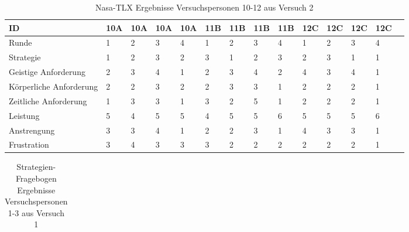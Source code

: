 \documentclass[12pt,a4paper]{scrartcl}
\begin{document}
\begin{appendix}
\begin{table}
\bigskip\bigskip  %
\caption{Nasa-TLX Ergebnisse Versuchspersonen 10-12 aus Versuch 2}

\smallskip
\begin{tabular}{|p{6cm}| p{0.8cm} | p{0.8cm} | p{0.8cm} | p{0.8cm} || p{0.8cm} | p{0.8cm} | p{0.8cm} | p{0.8cm} || p{0.8cm} | p{0.8cm} | p{0.8cm} | p{0.8cm} | p{} | }
\hline
	ID & 10A & 10A & 10A & 10A & 11B & 11B & 11B & 11B & 12C & 12C & 12C & 12C \\ \hline \hline
	Runde & 1 & 2 & 3 & 4 & 1 & 2 & 3 & 4 & 1 & 2 & 3 & 4 \\ \hline
	Strategie & 1 & 2 & 3 & 2 & 3 & 1 & 2 & 3 & 2 & 3 & 1 & 1 \\ \hline \hline
	Geistige Anforderung & 2 & 3 & 4 & 1 & 2 & 3 & 4 & 2 & 4 & 3 & 4 & 1 \\ \hline
	Körperliche Anforderung & 2 & 2 & 3 & 2 & 2 & 3 & 3 & 1 & 2 & 2 & 2 & 1 \\ \hline
	Zeitliche Anforderung & 1 & 3 & 3 & 1 & 3 & 2 & 5 & 1 & 2 & 2 & 2 & 1 \\ \hline
	Leistung & 5 & 4 & 5 & 5 & 4 & 5 & 5 & 6 & 5 & 5 & 5 & 6 \\ \hline
	Anstrengung & 3 & 3 & 4 & 1 & 2 & 2 & 3 & 1 & 4 & 3 & 3 & 1 \\ \hline
	Frustration & 3 & 4 & 3 & 3 & 3 & 2 & 2 & 2 & 2 & 2 & 2 & 1 \\ \hline
\end{tabular}
\end{table}


\begin{table}
\caption{Strategien-Fragebogen Ergebnisse Versuchspersonen 1-3 aus Versuch 1}
\begin{tabular}{|p{6cm}| p{0.8cm} | p{0.8cm} | p{0.8cm} | p{0.8cm} || p{0.8cm} | p{0.8cm} | p{0.8cm} | p{0.8cm} || p{0.8cm} | p{0.8cm} | p{0.8cm} | p{0.8cm} | p{} | }
\hline


\end{tabular}
\end{table}
\end{appendix}
\end{document}
